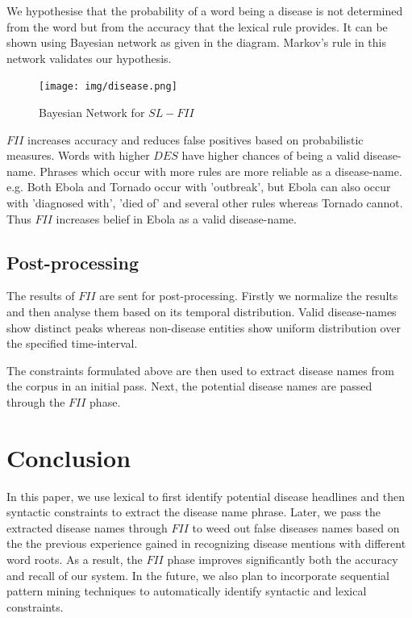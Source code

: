 \documentclass{article}
\begin{document}
We hypothesise that the probability of a word being a disease is not determined from the word but from the accuracy that the lexical rule provides.
It can be shown using Bayesian network as given in the diagram. Markov's rule in this network validates our hypothesis. 

\begin{figure}[h]
\centering
\texttt{[image: img/disease.png]}
\caption{Bayesian Network for $SL-FII$}
\label{fig:disease}
\end{figure}

$FII$ increases accuracy and reduces false positives based on probabilistic measures. Words with higher $DES$ have higher chances of being a valid disease-name. Phrases which occur with more rules are more reliable as a disease-name. 
e.g. Both Ebola and Tornado occur with 'outbreak', but Ebola can also occur with 'diagnosed with', 'died of' and several other rules whereas Tornado cannot. Thus $FII$ increases belief in Ebola as a valid disease-name. 

\subsection{Post-processing}
The results of $FII$ are sent for post-processing. Firstly we normalize the results and then analyse them based on its temporal distribution. Valid disease-names show distinct peaks whereas non-disease entities show uniform distribution over the specified time-interval. 

The constraints formulated above are then used to extract disease names from the corpus in an initial pass. Next, the potential disease names are passed through the $FII$ phase.

\section{Conclusion}
In this paper, we use lexical to first identify potential disease headlines and then syntactic constraints to extract the disease name phrase. Later, we pass the extracted disease names through $FII$ to weed out false diseases names based on the the previous experience gained in recognizing disease mentions with different word roots. As a result, the $FII$ phase improves significantly both the accuracy and recall of our system. In the future, we also plan to incorporate sequential pattern mining techniques to automatically identify syntactic and lexical constraints.  


\end{document}
